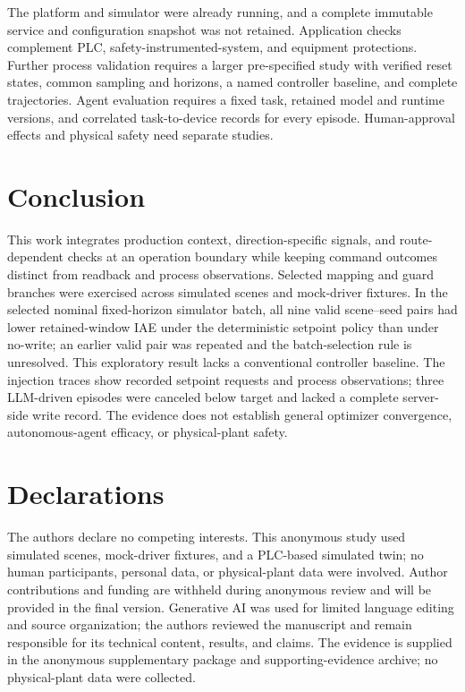 \documentclass[journal]{IEEEtran}
\begin{document}
The platform and simulator were already running, and a complete immutable service and configuration snapshot was not retained. Application checks complement PLC, safety-instrumented-system, and equipment protections. Further process validation requires a larger pre-specified study with verified reset states, common sampling and horizons, a named controller baseline, and complete trajectories. Agent evaluation requires a fixed task, retained model and runtime versions, and correlated task-to-device records for every episode. Human-approval effects and physical safety need separate studies.

\section{Conclusion}
\label{sec:conclusion}
This work integrates production context, direction-specific signals, and route-dependent checks at an operation boundary while keeping command outcomes distinct from readback and process observations. Selected mapping and guard branches were exercised across simulated scenes and mock-driver fixtures. In the selected nominal fixed-horizon simulator batch, all nine valid scene--seed pairs had lower retained-window IAE under the deterministic setpoint policy than under no-write; an earlier valid pair was repeated and the batch-selection rule is unresolved. This exploratory result lacks a conventional controller baseline. The injection traces show recorded setpoint requests and process observations; three LLM-driven episodes were canceled below target and lacked a complete server-side write record. The evidence does not establish general optimizer convergence, autonomous-agent efficacy, or physical-plant safety.
 
\section*{Declarations}
The authors declare no competing interests. This anonymous study used simulated scenes, mock-driver fixtures, and a PLC-based simulated twin; no human participants, personal data, or physical-plant data were involved. Author contributions and funding are withheld during anonymous review and will be provided in the final version. Generative AI was used for limited language editing and source organization; the authors reviewed the manuscript and remain responsible for its technical content, results, and claims. The evidence is supplied in the anonymous supplementary package and supporting-evidence archive; no physical-plant data were collected.



\end{document}
